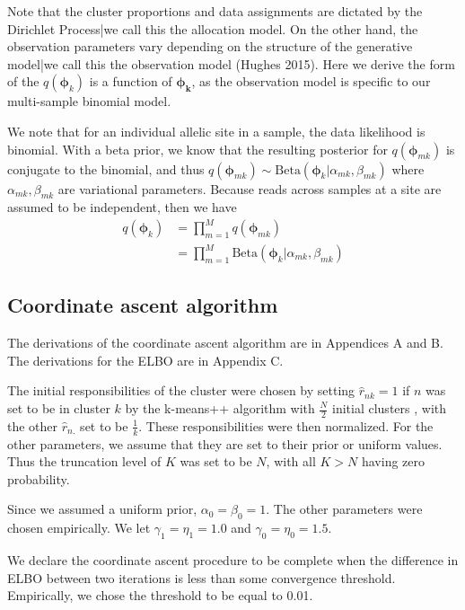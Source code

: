 \documentclass[11pt]{article}
\begin{document}
Note that the cluster proportions and data assignments are dictated by the Dirichlet Process|we call this the allocation model. On the other hand, the observation parameters vary depending on the structure of the generative model|we call this the observation model (Hughes 2015). Here we derive the form of the  $q(\bm{\phi}_k)$ is a function of $\bm{\phi_k}$, as the observation model is specific to our multi-sample binomial model.

We note that for an individual allelic site in a sample, the data likelihood is binomial. With a beta prior, we know that the resulting posterior for $q(\bm{\phi}_{mk})$ is conjugate to the binomial, and thus $q(\bm{\phi}_{mk}) \sim \mathrm{Beta}(\bm{\phi}_k | \alpha_{mk}, \beta_{mk})$ where $\alpha_{mk}, \beta_{mk}$ are variational parameters. Because reads across samples at a site are assumed to be independent, then we have 
\begin{align*}
q(\bm{\phi}_k)  &= \prod\limits_{m=1}^M q(\bm{\phi}_{mk}) \\
				&= \prod\limits_{m=1}^M \mathrm{Beta}(\bm{\phi}_k | \alpha_{mk}, \beta_{mk})
\end{align*}
\newpage
\subsection{Coordinate ascent algorithm}

The derivations of the coordinate ascent algorithm are in Appendices A and B. The derivations for the ELBO are in Appendix C.

The initial responsibilities of the cluster were chosen by setting $\hat{r}_{nk} = 1$ if $n$ was set to be in cluster $k$ by the k-means++ algorithm with $\frac{N}{2}$ initial clusters \cite{Hughes2015}, with the other $\hat{r}_{n.}$ set to be $\frac{1}{k}$. These responsibilities were then normalized. For the other parameters, we assume that they are set to their prior or uniform values. Thus the truncation level of $K$ was set to be $N$, with all $K > N$ having zero probability.

Since we assumed a uniform prior, $\alpha_0 = \beta_0 = 1$. The other parameters were chosen empirically. We let $\gamma_1 = \eta_1 = 1.0$ and $\gamma_0 = \eta_0 = 1.5$.

We declare the coordinate ascent procedure to be complete when the difference in ELBO between two iterations is less than some convergence threshold. Empirically, we chose the threshold to be equal to 0.01. 
\end{document}
